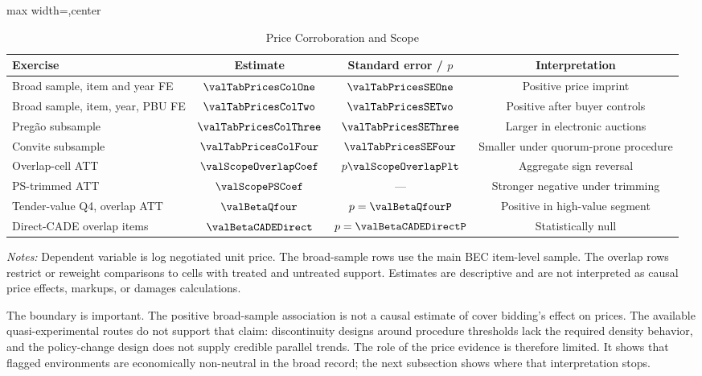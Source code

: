 \begin{table}[htbp]
\centering
\caption{Price Corroboration and Scope}
\label{tab:price_scope_v18}
\footnotesize
\begin{adjustbox}{max width=\textwidth,center}
\begin{threeparttable}
\begin{tabular}{p{5.2cm}ccc}
\toprule
Exercise & Estimate & Standard error / $p$ & Interpretation \\
\midrule
Broad sample, item and year FE & $\valTabPricesColOne$ &
$\valTabPricesSEOne$ & Positive price imprint \\
Broad sample, item, year, PBU FE & $\valTabPricesColTwo$ &
$\valTabPricesSETwo$ & Positive after buyer controls \\
Pregão subsample & $\valTabPricesColThree$ &
$\valTabPricesSEThree$ & Larger in electronic auctions \\
Convite subsample & $\valTabPricesColFour$ &
$\valTabPricesSEFour$ & Smaller under quorum-prone procedure \\
\midrule
Overlap-cell ATT & $\valScopeOverlapCoef$ &
$p\valScopeOverlapPlt$ & Aggregate sign reversal \\
PS-trimmed ATT & $\valScopePSCoef$ &
--- & Stronger negative under trimming \\
Tender-value Q4, overlap ATT & $\valBetaQfour$ &
$p=\valBetaQfourP$ & Positive in high-value segment \\
Direct-CADE overlap items & $\valBetaCADEDirect$ &
$p=\valBetaCADEDirectP$ & Statistically null \\
\bottomrule
\end{tabular}
\begin{tablenotes}
\footnotesize
\item \textit{Notes:} Dependent variable is log negotiated unit
price. The broad-sample rows use the main BEC item-level sample.
The overlap rows restrict or reweight comparisons to cells with
treated and untreated support. Estimates are descriptive and are
not interpreted as causal price effects, markups, or damages
calculations.
\end{tablenotes}
\end{threeparttable}
\end{adjustbox}
\end{table}

The boundary is important. The positive broad-sample
association is not a causal estimate of cover bidding's effect
on prices. The available quasi-experimental routes do not
support that claim: discontinuity designs around procedure
thresholds lack the required density behavior, and the
policy-change design does not supply credible parallel trends.
The role of the price evidence is therefore limited. It shows
that flagged environments are economically non-neutral in the
broad record; the next subsection shows where that
interpretation stops.

